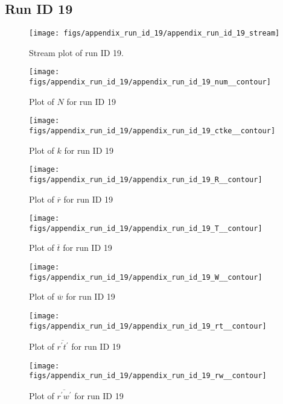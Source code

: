 \subsection{Run ID 19}
\begin{figure}[H]
\centering
\texttt{[image: figs/appendix\_run\_id\_19/appendix\_run\_id\_19\_stream]}
\caption{Stream plot of run ID 19.}
\label{fig:appendix_run_id_19_stream}
\end{figure}


\begin{figure}[H]
\centering
\texttt{[image: figs/appendix\_run\_id\_19/appendix\_run\_id\_19\_num\_\_contour]}
\caption{Plot of $N$ for run ID 19}
\label{fig:appendix_run_id_19_num__contour}
\end{figure}


\begin{figure}[H]
\centering
\texttt{[image: figs/appendix\_run\_id\_19/appendix\_run\_id\_19\_ctke\_\_contour]}
\caption{Plot of $k$ for run ID 19}
\label{fig:appendix_run_id_19_ctke__contour}
\end{figure}


\begin{figure}[H]
\centering
\texttt{[image: figs/appendix\_run\_id\_19/appendix\_run\_id\_19\_R\_\_contour]}
\caption{Plot of $\overline{r}$ for run ID 19}
\label{fig:appendix_run_id_19_R__contour}
\end{figure}


\begin{figure}[H]
\centering
\texttt{[image: figs/appendix\_run\_id\_19/appendix\_run\_id\_19\_T\_\_contour]}
\caption{Plot of $\overline{t}$ for run ID 19}
\label{fig:appendix_run_id_19_T__contour}
\end{figure}


\begin{figure}[H]
\centering
\texttt{[image: figs/appendix\_run\_id\_19/appendix\_run\_id\_19\_W\_\_contour]}
\caption{Plot of $\overline{w}$ for run ID 19}
\label{fig:appendix_run_id_19_W__contour}
\end{figure}


\begin{figure}[H]
\centering
\texttt{[image: figs/appendix\_run\_id\_19/appendix\_run\_id\_19\_rt\_\_contour]}
\caption{Plot of $\overline{r^\prime t^\prime}$ for run ID 19}
\label{fig:appendix_run_id_19_rt__contour}
\end{figure}


\begin{figure}[H]
\centering
\texttt{[image: figs/appendix\_run\_id\_19/appendix\_run\_id\_19\_rw\_\_contour]}
\caption{Plot of $\overline{r^\prime w^\prime}$ for run ID 19}
\label{fig:appendix_run_id_19_rw__contour}
\end{figure}


